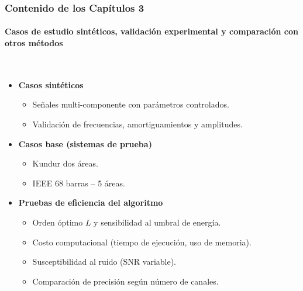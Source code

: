 \documentclass{beamer}
\begin{document}
\begin{frame}
\frametitle{Contenido de los Capítulos 3 }
\framesubtitle{Casos de estudio sintéticos, validación experimental y comparación con otros métodos}


\centering
{} \\

\begin{itemize}
    \item \textbf{Casos sintéticos}
    \begin{itemize}
        \small
        \item Señales multi-componente con parámetros controlados.
        \item Validación de frecuencias, amortiguamientos y amplitudes.
    \end{itemize}
    \item \textbf{Casos base (sistemas de prueba)}
    \begin{itemize}
        \small
        \item Kundur dos áreas.
        \item IEEE 68 barras – 5 áreas.
    \end{itemize}
    \item \textbf{Pruebas de eficiencia del algoritmo}
    \begin{itemize}
        \small
        \item Orden óptimo \(L\) y sensibilidad al umbral de energía.
        \item Costo computacional (tiempo de ejecución, uso de memoria).
        \item Susceptibilidad al ruido (SNR variable).
        \item Comparación de precisión según número de canales.
    \end{itemize}
\end{itemize}

\end{frame}
\end{document}
